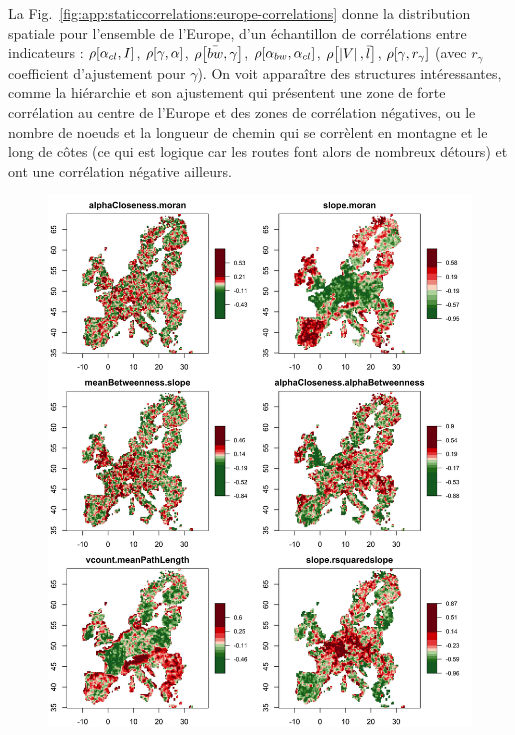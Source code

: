 La Fig.~\ref{fig:app:staticcorrelations:europe-correlations} donne la distribution spatiale pour l'ensemble de l'Europe, d'un échantillon de corrélations entre indicateurs : $\rho\!\left[\alpha_{cl},I\right]$, $\rho\!\left[\gamma,\alpha\right]$, $\rho\!\left[\bar{bw},\gamma\right]$, $\rho\!\left[\alpha_{bw},\alpha_{cl}\right]$, $\rho\!\left[\left|V\right|,\bar{l}\right]$, $\rho\!\left[\gamma,r_{\gamma}\right]$ (avec $r_{\gamma}$ coefficient d'ajustement pour $\gamma$). On voit apparaître des structures intéressantes, comme la hiérarchie et son ajustement qui présentent une zone de forte corrélation au centre de l'Europe et des zones de corrélation négatives, ou le nombre de noeuds et la longueur de chemin qui se corrèlent en montagne et le long de côtes (ce qui est logique car les routes font alors de nombreux détours) et ont une corrélation négative ailleurs.

\begin{figure}
	\includegraphics[width=\linewidth]{Figures/Final/A-staticcorrelations-europe-correlations.jpg}
\end{figure}
